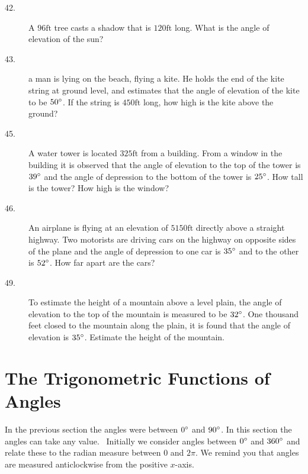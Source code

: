 \begin{description}
\item [42.] A $96 \mbox{ft}$ tree casts a shadow that is $120 \mbox{ft}$ long. What is the angle of elevation of the sun?


\item [43.] a man is lying on the beach, flying a kite. He
holds the end of the kite string at ground level, and estimates that the angle of elevation of the kite to be $50 \mbox{{\ensuremath{{}^\circ}}}$. If the string is $450 \mbox{ft}$ long, how high is the kite above the ground? 

\item [45.]
A water tower is located $325 \mbox{ft}$ from a building. From a window in the building
it is observed that the angle of elevation to the top of the tower is $39 \mbox{{\ensuremath{{}^\circ}}}$ and the angle of depression to the bottom of the tower is $25 \mbox{{\ensuremath{{}^\circ}}}$. How tall is the tower? How
high is the window? 

\item [46.] An airplane is flying at an
elevation of $5150 \mbox{ft}$ directly above a straight highway. Two motorists
are driving cars on the highway on opposite sides of the plane and the angle of depression to one car is $35 \mbox{{\ensuremath{{}^\circ}}}$ and to the other is $52 \mbox{{\ensuremath{{}^\circ}}}$. How far apart are the cars? 

\item [49.]
To estimate the height of a mountain above a level plain, the angle of elevation to the top of the mountain is measured to be $32 \mbox{{\ensuremath{{}^\circ}}}$. One thousand feet closed to the mountain along
the plain, it is found that the angle of elevation is $35 \mbox{{\ensuremath{{}^\circ}}}$. Estimate the height of the mountain. \end{description}

 

\section{The Trigonometric Functions of Angles}


In the previous section the angles were between $0 \mbox{{\ensuremath{{}^\circ}}}$ and $90 \mbox{{\ensuremath{{}^\circ}}}$. In this section the angles can take any value.
\ Initially we consider angles between $0 \mbox{{\ensuremath{{}^\circ}}}$ and $360 \mbox{{\ensuremath{{}^\circ}}}$ and relate these to the radian measure between $0$ and $2 \pi $. We remind you that angles are measured anticlockwise from the positive $x$-axis. 

